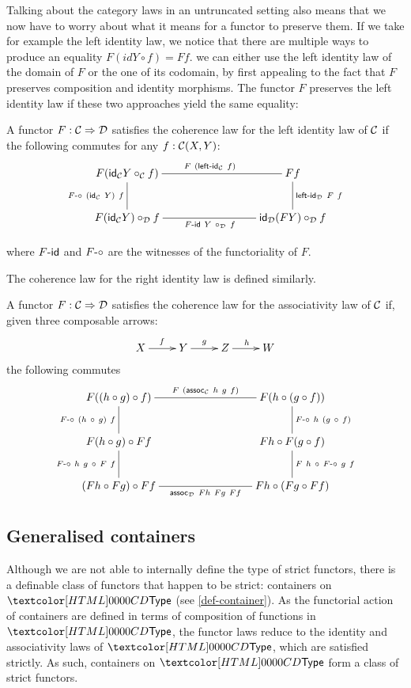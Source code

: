 Talking about the category laws in an untruncated setting also means
that we now have to worry about what it means for a functor to
preserve them. If we take for example the left identity law, we notice
that there are multiple ways to produce an equality
$F (id Y \circ f) = F f$. we can either use the left identity law of
the domain of $F$ or the one of its codomain, by first appealing to
the fact that $F$ preserves composition and identity morphisms. The
functor $F$ preserves the left identity law if these two approaches
yield the same equality:

\begin{definition}
  A functor $F : \mathcal{C} \Rightarrow \mathcal{D}$ satisfies the coherence law for the
  left identity law of $\mathcal{C}$ if the following commutes for any $f : \mathcal{C}(X,Y)$:
  $$
  \xymatrix{
    F (\id_{\Cc} Y \circ_{\Cc} f) \ar@{-}[rrr]^{F\ (\leftid_{\Cc}\ f)} \ar@{-}[d]_{\Fcomp\ (\id_{\Cc}\ Y)\ f} &&&F f \ar@{-}[d]^{\leftid_{\Dd}\ F\ f} \\
    F (\id_{\Cc} Y) \circ_{\Dd} f \ar@{-}[rrr]_{\Fid\ Y\ \circ_{\Dd}\ f} &&&\id_{\Dd} (F Y) \circ_{\Dd} f
  }
  $$  
\end{definition}

where $\Fid$ and $\Fcomp$ are the witnesses of the functoriality of
$F$.

The coherence law for the right identity law is defined similarly.

\begin{definition}
  A functor $F : \mathcal{C} \Rightarrow \mathcal{D}$ satisfies the coherence law for the
  associativity law of $\mathcal{C}$ if, given three composable arrows:
  $$
  \xymatrix{
    X \ar[r]^{f} &Y \ar[r]^{g} &Z \ar[r]^{h} &W
  }
  $$
  the following commutes
  $$
  \xymatrix{
    F ((h \circ g) \circ f) \ar@{-}[rrr]^{F\ (\assoc_{\Cc}\ h\ g\ f)} \ar@{-}[d]_{\Fcomp\ (h\ \circ\ g)\ f} &&&F (h \circ (g \circ f)) \ar@{-}[d]^{\Fcomp\ h\ (g\ \circ\ f)} \\
    F (h \circ g) \circ F f \ar@{-}[d]_{\Fcomp\ h\ g\ \circ\ F\ f} &&&F h \circ F (g \circ f) \ar@{-}[d]^{F\ h\ \circ\ \Fcomp\ g\ f} \\
    (F h \circ F g) \circ F f  \ar@{-}[rrr]_{\assoc_{\Dd}\ Fh\ Fg\ Ff} &&& F h \circ (F g \circ F f)
  }
  $$
\end{definition}

\subsection{Generalised containers}

Although we are not able to internally define the type of strict
functors, there is a definable class of functors that happen to be
strict: containers on $\Type$ (see \cref{def-container}). As the
functorial action of containers are defined in terms of composition of
functions in $\Type$, the functor laws reduce to the identity and
associativity laws of $\Type$, which are satisfied strictly. As such,
containers on $\Type$ form a class of strict functors.

